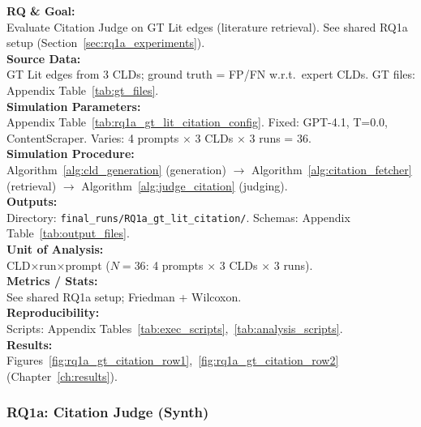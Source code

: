 \textbf{RQ \& Goal:}\\
Evaluate Citation Judge on GT Lit edges (literature retrieval). See shared RQ1a setup (Section~\ref{sec:rq1a_experiments}).\\
\textbf{Source Data:}\\
GT Lit edges from 3 CLDs; ground truth = FP/FN w.r.t.\ expert CLDs. GT files: Appendix Table~\ref{tab:gt_files}.\\
\textbf{Simulation Parameters:}\\
Appendix Table~\ref{tab:rq1a_gt_lit_citation_config}. Fixed: GPT-4.1, T=0.0, ContentScraper. Varies: 4 prompts $\times$ 3 CLDs $\times$ 3 runs = 36.\\
\textbf{Simulation Procedure:}\\
Algorithm~\ref{alg:cld_generation} (generation) $\rightarrow$ Algorithm~\ref{alg:citation_fetcher} (retrieval) $\rightarrow$ Algorithm~\ref{alg:judge_citation} (judging).\\
\textbf{Outputs:}\\
Directory: \texttt{final\_runs/RQ1a\_gt\_lit\_citation/}. Schemas: Appendix Table~\ref{tab:output_files}.\\
\textbf{Unit of Analysis:}\\
CLD$\times$run$\times$prompt ($N=36$: 4 prompts $\times$ 3 CLDs $\times$ 3 runs).\\
\textbf{Metrics / Stats:}\\
See shared RQ1a setup; Friedman + Wilcoxon.\\
\textbf{Reproducibility:}\\
Scripts: Appendix Tables~\ref{tab:exec_scripts},~\ref{tab:analysis_scripts}.\\
\textbf{Results:}\\
Figures~\ref{fig:rq1a_gt_citation_row1},~\ref{fig:rq1a_gt_citation_row2} (Chapter~\ref{ch:results}).

\subsubsection{RQ1a: Citation Judge (Synth)}
\label{sec:rq1a_citation_synth}

